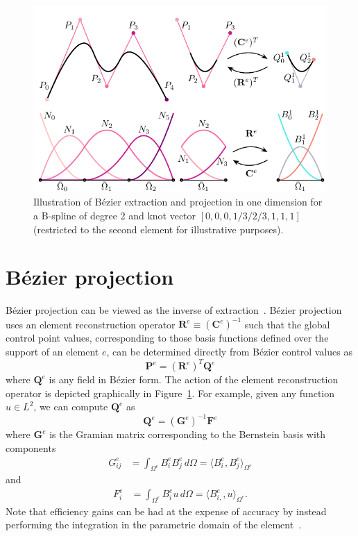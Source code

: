 \documentclass{article}
\newcommand{\Bezier}{{B\'{e}zier} }
\begin{document}
\begin{figure}
  \centering
  \includegraphics[width=.6\linewidth]{elements_global.pdf}
  \caption{Illustration of B\'ezier extraction and projection in one dimension for a B-spline of degree 2 and knot vector $[0,0,0,1/3/2/3,1,1,1]$ (restricted to the second element for illustrative purposes).}
    \label{fig:extraction_and_projection}
\end{figure}
\section{B\'ezier projection}
\label{sec:bproject}

B\'{e}zier projection can be viewed as the inverse of extraction~\cite{thomas_bezier_2015}. B\'ezier projection uses an element reconstruction operator $\mathbf{R}^e\equiv(\mathbf{C}^e)^{-1}$ such that the global control point values, corresponding to those basis functions defined over the support of an element $e$, can be determined directly from \Bezier control values as
\begin{equation}
\mathbf{P}^e=(\mathbf{R}^e)^T\mathbf{Q}^e
\end{equation}
where $\mathbf{Q}^e$ is any field in B\'ezier form. The action of the element reconstruction operator is depicted graphically in Figure~\ref{fig:extraction_and_projection}. For example, given any function $u \in L^2$, we can compute $\mathbf{Q}^e$ as
\begin{equation}
\mathbf{Q}^e=(\mathbf{G}^e)^{-1}\mathbf{F}^e
\label{eq:element-Qi}
\end{equation}
where $\mathbf{G}^e$ is the Gramian matrix corresponding to the Bernstein basis with components
\begin{align}
  {G}_{ij}^e &= \int_{\Omega^e} B^e_i B^e_j \, d\Omega =\langle{B^e_{i},B^e_{j}}\rangle_{\Omega^e}
\end{align}
and
\begin{align}
  {F}^e_i &=  \int_{\Omega^e} B^e_i u \, d\Omega = \langle{B^e_{i,},u}\rangle_{\Omega^e}.
\end{align}
Note that efficiency gains can be had at the expense of accuracy by instead performing the integration in the parametric domain of the element~\cite{thomas_bezier_2015}. 
\end{document}
